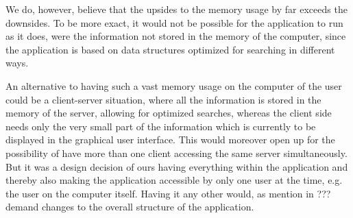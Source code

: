 We do, however, believe that the upsides to the memory usage by far exceeds the downsides. To be more exact, it would not be possible for the application to run as it does, were the information not stored in the memory of the computer, since the application is based on data structures optimized for searching in different ways.

An alternative to having such a vast memory usage on the computer of the user could be a client-server situation, where all the information is stored in the memory of the server, allowing for optimized searches, whereas the client side needs only the very small part of the information which is currently to be displayed in the graphical user interface. This would moreover open up for the possibility of have more than one client accessing the same server simultaneously. But it was a design decision of ours having everything within the application and thereby also making the application accessible by only one user at the time, e.g. the user on the computer itself. Having it any other would, as mention in ??? demand changes to the overall structure of the application.